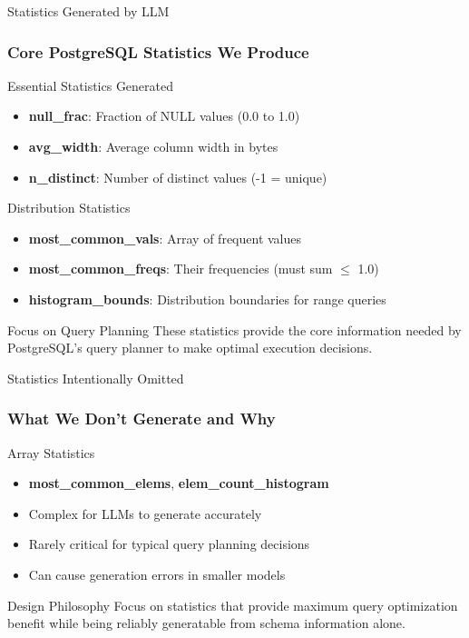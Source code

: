 \documentclass[smaller]{beamer}
\begin{document}
\begin{frame}{Statistics Generated by LLM}
\frametitle{Core PostgreSQL Statistics We Produce}

\begin{block}{Essential Statistics Generated}
\begin{itemize}
    \item \textbf{null\_frac}: Fraction of NULL values (0.0 to 1.0)
    \item \textbf{avg\_width}: Average column width in bytes
    \item \textbf{n\_distinct}: Number of distinct values (-1 = unique)
\end{itemize}
\end{block}

\begin{block}{Distribution Statistics}
\begin{itemize}
    \item \textbf{most\_common\_vals}: Array of frequent values
    \item \textbf{most\_common\_freqs}: Their frequencies (must sum $\leq$ 1.0)
    \item \textbf{histogram\_bounds}: Distribution boundaries for range queries
\end{itemize}
\end{block}

\begin{alertblock}{Focus on Query Planning}
These statistics provide the core information needed by PostgreSQL's query planner to make optimal execution decisions.
\end{alertblock}

\end{frame}

\begin{frame}{Statistics Intentionally Omitted}
\frametitle{What We Don't Generate and Why}

\begin{alertblock}{Array Statistics}
\begin{itemize}
    \item \textbf{most\_common\_elems}, \textbf{elem\_count\_histogram}
    \item Complex for LLMs to generate accurately
    \item Rarely critical for typical query planning decisions
    \item Can cause generation errors in smaller models
\end{itemize}
\end{alertblock}

\begin{block}{Design Philosophy}
Focus on statistics that provide maximum query optimization benefit while being reliably generatable from schema information alone.
\end{block}

\end{frame}
\end{document}
